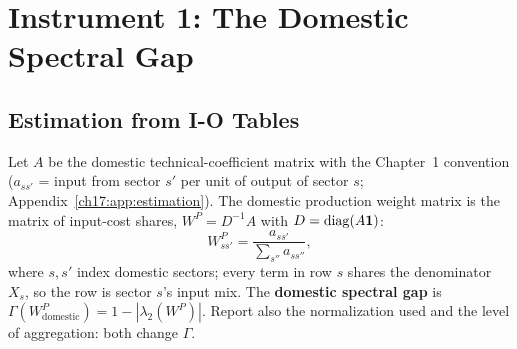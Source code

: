 \documentclass[../structural_economics_book.tex]{subfiles}
\begin{document}
\section{Instrument 1: The Domestic Spectral Gap}
\label{ch17:sec:gamma}

\subsection{Estimation from I-O Tables}

\begin{definition}\label{ch17:def:domestic_gamma}
Let $A$ be the domestic technical-coefficient matrix with the Chapter~1 convention ($a_{ss'}$ = input from sector $s'$ per unit of output of sector $s$; Appendix~\ref{ch17:app:estimation}). The domestic production weight matrix is the matrix of input-cost shares, $W^P = D^{-1}A$ with $D = \operatorname{diag}(A\mathbf{1})$:
\begin{equation}\label{ch17:eq:domestic_WP}
W^P_{ss'} = \frac{a_{ss'}}{\sum_{s''} a_{ss''}},
\end{equation}
where $s, s'$ index domestic sectors; every term in row $s$ shares the denominator $X_s$, so the row is sector $s$'s input mix. The \textbf{domestic spectral gap} is $\Gamma(W^P_{\text{domestic}}) = 1 - |\lambda_2(W^P)|$. Report also the normalization used and the level of aggregation: both change $\Gamma$.
\end{definition}
\end{document}

